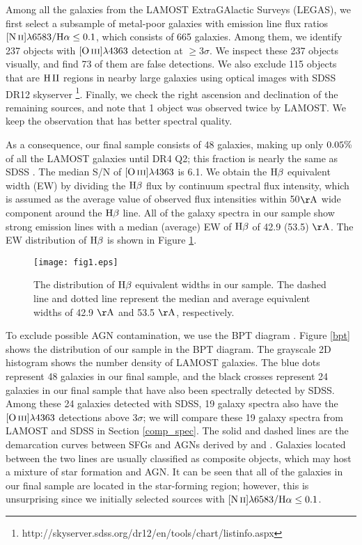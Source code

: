 \documentclass[usenatbib]{raa}
\begin{document}
Among all the galaxies from the LAMOST ExtraGAlactic Surveys (LEGAS), we first 
select
a subsample of metal-poor galaxies
with emission line flux ratios $\hbox{[N\,{\sc ii}]}\lambda6583/\hbox{H$\alpha$} \le 0.1$, which consists of 665 galaxies.
Among them, we identify  237 objects with  $\hbox{[O\,{\sc iii}]}\lambda4363$
detection at $\ge 3 \sigma$.  
We inspect these 237 objects visually, and find 73 of them are false 
detections. We also exclude 
 115 objects  
that are $\rm \hii$ regions in nearby large galaxies  using optical 
images with SDSS 
DR12 skyserver \footnote{http://skyserver.sdss.org/dr12/en/tools/chart/listinfo.aspx}. 
 Finally, we check the right ascension and declination of  the remaining sources, and 
note that  1 object was observed  twice by LAMOST.  We 
keep the observation that has better spectral quality.

As a consequence, our final sample consists of  48 galaxies, making up
only $\rm 0.05\%$ of all the LAMOST galaxies until
DR4 Q2; this fraction is nearly the same as SDSS \citep{2014ApJ...780..122L}. 
The median S/N of $\hbox{[O\,{\sc iii}]}\lambda4363$ is  6.1. 
We obtain the $\hbox{H$\beta$}$ equivalent width (EW) by dividing the $\hbox{H$\beta$}$ flux by 
continuum spectral flux
intensity, which is assumed as the average value of observed flux intensities 
within
50$\rm \AA$ wide component around the $\hbox{H$\beta$}$ line. 
All of the galaxy spectra in our sample show strong emission lines with a 
median (average) EW of $\hbox{H$\beta$}$ of  42.9 (53.5) $\mathrm{\AA}$. 
The EW distribution of  $\hbox{H$\beta$}$ is shown in Figure \ref{hist_hb}.

\begin{figure}[h]
\center
\texttt{[image: fig1.eps]}
\caption{The distribution of $\hbox{H$\beta$}$ equivalent widths in our sample. 
The dashed line and dotted line represent the median and average equivalent 
widths of 
42.9 $\rm \mathrm{\AA}$ and 53.5 $\rm \mathrm{\AA}$, respectively.} 
\label{hist_hb}
\end{figure}

 To exclude  possible AGN contamination, we use the BPT diagram
 \citep[see][]{1981PASP...93..817B,1987ApJS...63..295V,
 2001ApJ...556..121K,2003MNRAS.341...33K}. 
Figure \ref{bpt} shows the distribution of our sample  in the BPT diagram.
The grayscale 2D histogram shows the number density of LAMOST galaxies.
The blue dots represent 48 galaxies in our final sample, and the black crosses 
represent 24 galaxies in our final sample that have also been
spectrally detected by SDSS. Among these 24 galaxies detected with SDSS, 
19 galaxy spectra also have the $\hbox{[O\,{\sc iii}]}\lambda4363$ detections above 3$\sigma$; 
 we will compare these 19 galaxy spectra from LAMOST and SDSS in Section 
\ref{comp_spec}. 
The solid and dashed lines are the demarcation curves between SFGs and AGNs 
derived by 
 \cite{2003MNRAS.341...33K} and \cite{2001ApJ...556..121K}. 
 Galaxies located between the two lines are usually classified as composite
 objects, which may host a mixture of star formation and AGN.  
 It can be seen that all of the galaxies in our final sample are located in the 
 star-forming region; however, this is unsurprising since we initially selected 
sources
 with $\hbox{[N\,{\sc ii}]}\lambda6583/\hbox{H$\alpha$} \le 0.1$. 
 
\end{document}
